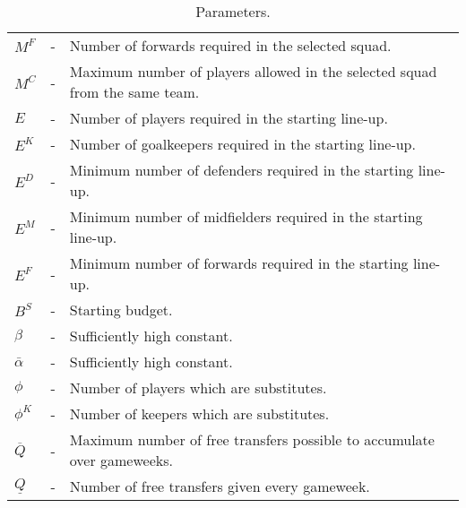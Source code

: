 \begin{table}[H]
{{\begin{tabular}{@{}lll@{}}
$M^{F}$                          & - & Number of forwards required in the selected squad.                                              \\
$M^{C}$                          & - & Maximum number of players allowed in the selected squad from the same team.                                         \\
$E$                              & - & Number of players required in the starting line-up.                                               \\
$E^{K}$                          & - & Number of goalkeepers required in the starting line-up.                                           \\
$E^{D}$                          & - & Minimum number of defenders required in the starting line-up.                                     \\
$E^{M}$                          & - & Minimum number of midfielders required in the starting line-up.                                   \\
$E^{F}$                          & - & Minimum number of forwards required in the starting line-up.                                      \\
$B^{S}$                          & - & Starting budget.                                                                               \\
$\beta$                          & - & Sufficiently high constant.                                                                                  \\          
$\bar{\alpha}$                   & - & Sufficiently high constant.                                                                      \\

$\phi$                         & - & Number of players which are substitutes.                                                         \\
$\phi^{K}$                   & - & Number of keepers which are substitutes.                                                          \\
$\overline{Q}$                   & - & Maximum number of free transfers possible to accumulate over gameweeks.                        \\
$\underline{Q}$                  & - & Number of free transfers given every gameweek.                                                 \\ \bottomrule
\end{tabular}%
}
}
\caption{Parameters.}
\end{table}


